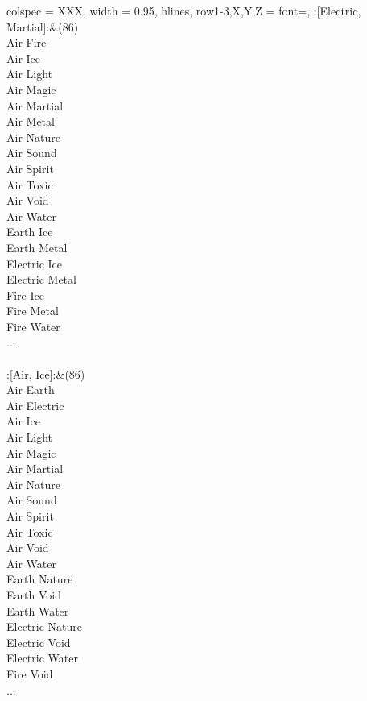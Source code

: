 \begin{longtblr}[
	caption = {2v2 Defending Weak},
	label = {2v2-Defending-Weak},
]{
	colspec = {XXX}, width = 0.95\linewidth,
	hlines,
	row{1-3,X,Y,Z} = {font=\bfseries},
}
	:[Electric, Martial]:&{(86)\\
	Air Fire \\
	Air Ice \\
	Air Light \\
	Air Magic \\
	Air Martial \\
	Air Metal \\
	Air Nature \\
	Air Sound \\
	Air Spirit \\
	Air Toxic \\
	Air Void \\
	Air Water \\
	Earth Ice \\
	Earth Metal \\
	Electric Ice \\
	Electric Metal \\
	Fire Ice \\
	Fire Metal \\
	Fire Water \\
	...\\
	}\\

	:[Air, Ice]:&{(86)\\
	Air Earth \\
	Air Electric \\
	Air Ice \\
	Air Light \\
	Air Magic \\
	Air Martial \\
	Air Nature \\
	Air Sound \\
	Air Spirit \\
	Air Toxic \\
	Air Void \\
	Air Water \\
	Earth Nature \\
	Earth Void \\
	Earth Water \\
	Electric Nature \\
	Electric Void \\
	Electric Water \\
	Fire Void \\
	...\\
	}\\


\end{longtblr}
